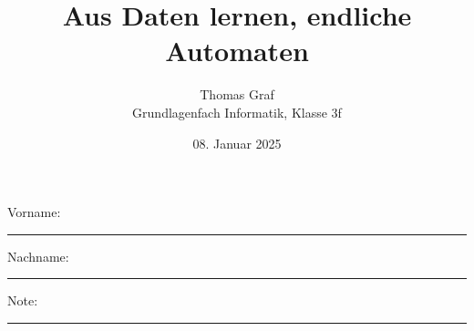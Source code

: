 \newtoggle{withbonus} \toggletrue{withbonus} %

\newcommand{\mycourse}{Grundlagenfach Informatik}
\newcommand{\myclass}{Klasse 3f}
\newcommand{\mydate}{08. Januar 2025}

\title{\textbf{Aus Daten lernen, endliche Automaten}}
\author{Thomas Graf\\
	\mycourse, \myclass}
\date{\mydate}
\maketitle
\thispagestyle{headandfoot}

\begin{center}
\end{center}
\vspace{10mm}

\begin{center}
	Vorname: \rule{45mm}{0.8pt}\qquad Nachname: \rule{45mm}{0.8pt}
\end{center}
\vspace{20mm}

\begin{center}
	\iftoggle{withbonus} {
		\combinedgradetable[h][questions]
	} {
		\gradetable[h][questions]
	}
\end{center}
\vspace{15mm}
\begin{center}
	Note:
	\vspace{10mm}

	\rule{8mm}{1.2pt}
\end{center}
\clearpage

